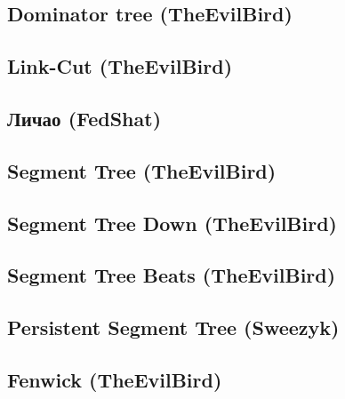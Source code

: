 \documentclass[a4paper]{article}
\begin{document}
\begin{multicols*}{2}
        \subsection{Dominator tree (TheEvilBird)}
            

        \subsection{Link-Cut (TheEvilBird)}
            
        
        \subsection{Личао (FedShat)}
            
            
        \subsection{Segment Tree (TheEvilBird)}
            
        
        \subsection{Segment Tree Down (TheEvilBird)}
            
        
        \subsection{Segment Tree Beats (TheEvilBird)}
            
        
        \subsection{Persistent Segment Tree (Sweezyk)}
            
            
        \subsection{Fenwick (TheEvilBird)}
            
        

\end{multicols*}
\end{document}
